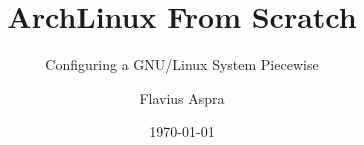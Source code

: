 \documentclass[a4paper,11pt,fleqn,twoside,openright,style=afs]{yapbook}
\title{ArchLinux From Scratch}
\subtitle{Configuring a GNU/Linux System Piecewise}
\author{Flavius Aspra}
\date{\today}
\begin{document}
\frontmatter

    \maketitle

    \makecopyright

    \tableofcontents

    

\mainmatter

    
    
    
    
    
    

\appendix

    

\backmatter
\end{document}
